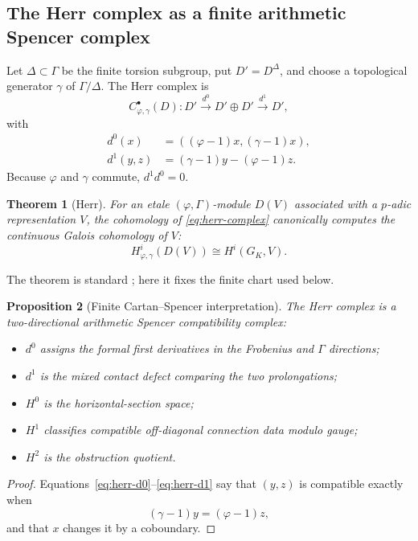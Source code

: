 \documentclass[11pt]{article}
\newtheorem{theorem}{Theorem}[section]
\newtheorem{proposition}[theorem]{Proposition}
\theoremstyle{definition}
\newcommand{\GK}{G_K}
\begin{document}
\subsection{The Herr complex as a finite arithmetic Spencer complex}

Let $\Delta\subset\Gamma$ be the finite torsion subgroup, put $D'=D^\Delta$, and choose a topological generator $\gamma$ of $\Gamma/\Delta$.  The Herr complex is
\begin{equation}\label{eq:herr-complex}
C^\bullet_{\varphi,\gamma}(D):
D'
\xrightarrow{d^0}
D'\oplus D'
\xrightarrow{d^1}
D',
\end{equation}
with
\begin{align}
 d^0(x)&=((\varphi-1)x,(\gamma-1)x),\label{eq:herr-d0}\\
 d^1(y,z)&=(\gamma-1)y-(\varphi-1)z.\label{eq:herr-d1}
\end{align}
Because $\varphi$ and $\gamma$ commute, $d^1d^0=0$.

\begin{theorem}[Herr]\label{thm:herr}
For an etale $(\varphi,\Gamma)$-module $D(V)$ associated with a $p$-adic representation $V$, the cohomology of \eqref{eq:herr-complex} canonically computes the continuous Galois cohomology of $V$:
\[
H^i_{\varphi,\gamma}(D(V))\cong H^i(\GK,V).
\]
\end{theorem}

The theorem is standard \cite{HerrSurvey,LiuCohomology}; here it fixes the finite chart used below.

\begin{proposition}[Finite Cartan--Spencer interpretation]\label{prop:herr-spencer}
The Herr complex is a two-directional arithmetic Spencer compatibility complex:
\begin{itemize}
\item $d^0$ assigns the formal first derivatives in the Frobenius and $\Gamma$ directions;
\item $d^1$ is the mixed contact defect comparing the two prolongations;
\item $H^0$ is the horizontal-section space;
\item $H^1$ classifies compatible off-diagonal connection data modulo gauge;
\item $H^2$ is the obstruction quotient.
\end{itemize}
\end{proposition}

\begin{proof}
Equations~\eqref{eq:herr-d0}--\eqref{eq:herr-d1} say that $(y,z)$ is compatible exactly when
\[
(\gamma-1)y=(\varphi-1)z,
\]
and that $x$ changes it by a coboundary.
\end{proof}
\end{document}
